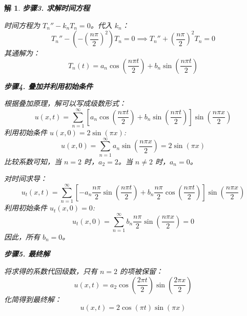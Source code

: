 \documentclass[12pt,a4paper]{article}
\newtheorem*{solution}{解}
\begin{document}
\begin{solution}
\hrulefill

\textbf{步骤3. 求解时间方程}

时间方程为 $T_n'' - k_n T_n = 0$。代入 $k_n$：
\[
T_n'' - \left(-\left(\frac{n\pi}{2}\right)^2\right) T_n = 0 \implies T_n'' + \left(\frac{n\pi}{2}\right)^2 T_n = 0
\]
其通解为：
\[
T_n(t) = a_n \cos\left(\frac{n\pi t}{2}\right) + b_n \sin\left(\frac{n\pi t}{2}\right)
\]

\hrulefill

\textbf{步骤4. 叠加并利用初始条件}

根据叠加原理，解可以写成级数形式：
\[
u(x,t) = \sum_{n=1}^\infty \left[ a_n \cos\left(\frac{n\pi t}{2}\right) + b_n \sin\left(\frac{n\pi t}{2}\right) \right] \sin\left(\frac{n\pi x}{2}\right)
\]
利用初始条件 $u(x,0) = 2\sin(\pi x)$:
\[
u(x,0) = \sum_{n=1}^\infty a_n \sin\left(\frac{n\pi x}{2}\right) = 2\sin(\pi x)
\]
比较系数可知，当 $n=2$ 时，$a_2=2$。当 $n \neq 2$ 时，$a_n=0$。

对时间求导：
\[
u_t(x,t) = \sum_{n=1}^\infty \left[ -a_n \frac{n\pi}{2} \sin\left(\frac{n\pi t}{2}\right) + b_n \frac{n\pi}{2} \cos\left(\frac{n\pi t}{2}\right) \right] \sin\left(\frac{n\pi x}{2}\right)
\]
利用初始条件 $u_t(x,0) = 0$:
\[
u_t(x,0) = \sum_{n=1}^\infty b_n \frac{n\pi}{2} \sin\left(\frac{n\pi x}{2}\right) = 0
\]
因此，所有 $b_n=0$。

\hrulefill

\textbf{步骤5. 最终解}

将求得的系数代回级数，只有 $n=2$ 的项被保留：
\[
u(x,t) = a_2 \cos\left(\frac{2\pi t}{2}\right) \sin\left(\frac{2\pi x}{2}\right)
\]
化简得到最终解：
\[
u(x,t) = 2\cos(\pi t)\sin(\pi x)
\]
	\end{solution}
	
\end{document}
